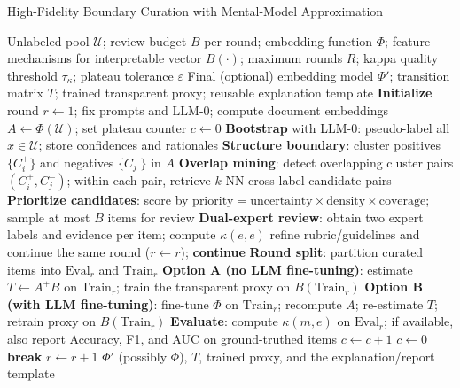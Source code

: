 \documentclass[ai,article,submit,pdftex,moreauthors]{Definitions/mdpi}
\begin{document}
\begin{algorithm}[H]
\caption{High-Fidelity Boundary Curation with Mental-Model Approximation}
\label{alg:curation_mma}
\begin{algorithmic}[1]
\Require Unlabeled pool $\mathcal{U}$; review budget $B$ per round; embedding function $\Phi$; feature mechanisms for interpretable vector $B(\cdot)$; maximum rounds $R$; kappa quality threshold $\tau_{\kappa}$; plateau tolerance $\varepsilon$
\Ensure Final (optional) embedding model $\Phi'$; transition matrix $T$; trained transparent proxy; reusable explanation template
\State \textbf{Initialize} round $r \gets 1$; fix prompts and LLM-0; compute document embeddings $A \leftarrow \Phi(\mathcal{U})$; set plateau counter $c \gets 0$
\vspace{2pt}
  \State \textbf{Bootstrap} with LLM-0: pseudo-label all $x \in \mathcal{U}$; store confidences and rationales
  \State \textbf{Structure boundary}: cluster positives $\{C_i^{+}\}$ and negatives $\{C_j^{-}\}$ in $A$
  \State \textbf{Overlap mining}: detect overlapping cluster pairs $(C_i^{+},C_j^{-})$; within each pair, retrieve $k$-NN cross-label candidate pairs
  \State \textbf{Prioritize candidates}: score by $\text{priority}=\text{uncertainty}\times\text{density}\times\text{coverage}$; sample at most $B$ items for review
  \State \textbf{Dual-expert review}: obtain two expert labels and evidence per item; compute $\kappa(e,e)$
     \State refine rubric/guidelines and continue the same round ($r \leftarrow r$); \textbf{continue}
  \EndIf
  \State \textbf{Round split}: partition curated items into $\mathrm{Eval}_r$ and $\mathrm{Train}_r$
  \State \textbf{Option A (no LLM fine-tuning)}: estimate $T \leftarrow A^{+}B$ on $\mathrm{Train}_r$; train the transparent proxy on $B(\mathrm{Train}_r)$
  \State \textbf{Option B (with LLM fine-tuning)}: fine-tune $\Phi$ on $\mathrm{Train}_r$; recompute $A$; re-estimate $T$; retrain proxy on $B(\mathrm{Train}_r)$
  \State \textbf{Evaluate}: compute $\kappa(m,e)$ on $\mathrm{Eval}_r$; if available, also report Accuracy, F1, and AUC on ground-truthed items
     \State $c \gets c + 1$
  \Else
     \State $c \gets 0$
  \EndIf
   
     \State \textbf{break}
  \EndIf
  \State $r \gets r + 1$
\EndWhile
\State \Return $\Phi'$ (possibly $\Phi$), $T$, trained proxy, and the explanation/report template
\end{algorithmic}
\end{algorithm}
%
%  
%  
\end{document}
